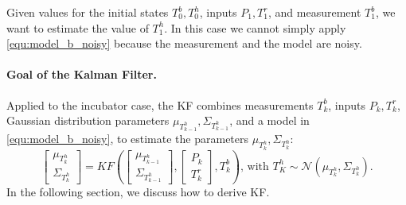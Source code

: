 Given values for the initial states $T^{b}_0,T^{h}_0$, inputs $P_1, T^r_1$, and measurement $T^{b}_1$, we want to estimate the value of $T^{h}_1$.
In this case we cannot simply apply \cref{equ:model_b_noisy} because 
the measurement and the model are noisy. 

\paragraph{Goal of the Kalman Filter.}
Applied to the incubator case, the KF combines measurements $T^{b}_k$,
inputs $P_k, T^r_k$, 
Gaussian distribution parameters $\mu_{T^{h}_{k-1}},\Sigma_{T^{h}_{k-1}}$,
and a model in \cref{equ:model_b_noisy}, to estimate the parameters 
$\mu_{T^{h}_{k}},\Sigma_{T^{h}_{k}}$:
\begin{equation} \label{equ:kf_summary}
  \begin{bmatrix}
		\mu_{T^{h}_{k}}\\
		\Sigma_{T^{h}_{k}}
	\end{bmatrix}
	=
	\mathit{KF}(
  	\begin{bmatrix}
  		\mu_{T^{h}_{k-1}}\\
  		\Sigma_{T^{h}_{k-1}}
  	\end{bmatrix},
  	\begin{bmatrix}
  		P_k\\
  		T^r_k
  	\end{bmatrix},
    T^{b}_k
  )
  \text{, \ \ \ with }
  T^{h}_K \sim \mathcal{N}(\mu_{T^{h}_k},\Sigma_{T^{h}_k}).
\end{equation}
In the following section, we discuss how to derive KF. 